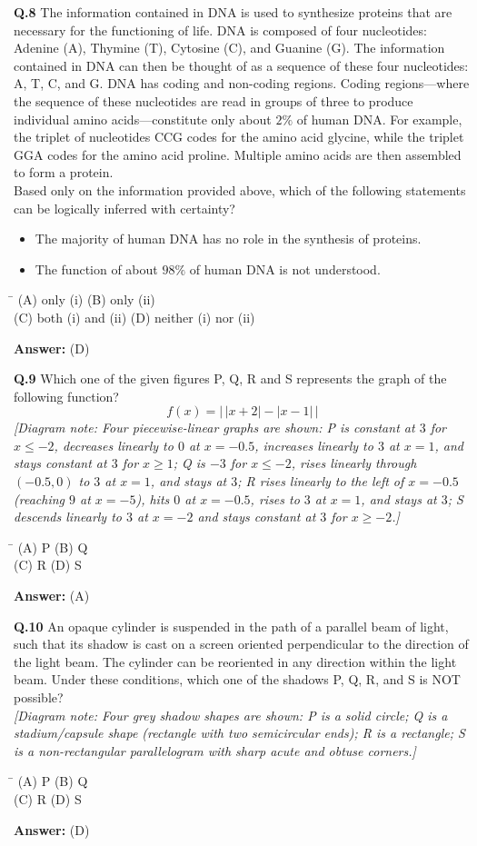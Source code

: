 \documentclass[11pt,a4paper]{article}
\newcommand{\optsfourA}[4]{%
  \begin{tabbing}
    \hspace{0.48\linewidth}\=\kill
    (A) #1 \> (B) #2 \\[2pt]
    (C) #3 \> (D) #4
  \end{tabbing}%
}
\newcommand{\ans}[1]{\textbf{Answer:} #1\par\medskip}
\begin{document}
\textbf{Q.8} The information contained in DNA is used to synthesize proteins that are necessary for the functioning of life. DNA is composed of four nucleotides: Adenine (A), Thymine (T), Cytosine (C), and Guanine (G). The information contained in DNA can then be thought of as a sequence of these four nucleotides: A, T, C, and G. DNA has coding and non-coding regions. Coding regions---where the sequence of these nucleotides are read in groups of three to produce individual amino acids---constitute only about $2\%$ of human DNA. For example, the triplet of nucleotides CCG codes for the amino acid glycine, while the triplet GGA codes for the amino acid proline. Multiple amino acids are then assembled to form a protein.\\
Based only on the information provided above, which of the following statements can be logically inferred with certainty?
\begin{itemize}
  \setlength{\itemsep}{1pt}\setlength{\parskip}{0pt}
  \item[(i)] The majority of human DNA has no role in the synthesis of proteins.
  \item[(ii)] The function of about $98\%$ of human DNA is not understood.
\end{itemize}
\optsfourA{only (i)}{only (ii)}{both (i) and (ii)}{neither (i) nor (ii)}
\ans{(D)}

\textbf{Q.9} Which one of the given figures P, Q, R and S represents the graph of the following function?
\[
  f(x) = \bigl|\,|x + 2| - |x - 1|\,\bigr|
\]
\emph{[Diagram note: Four piecewise-linear graphs are shown: P is constant at $3$ for $x \le -2$, decreases linearly to $0$ at $x = -0.5$, increases linearly to $3$ at $x = 1$, and stays constant at $3$ for $x \ge 1$; Q is $-3$ for $x \le -2$, rises linearly through $(-0.5, 0)$ to $3$ at $x = 1$, and stays at $3$; R rises linearly to the left of $x = -0.5$ (reaching $9$ at $x = -5$), hits $0$ at $x = -0.5$, rises to $3$ at $x = 1$, and stays at $3$; S descends linearly to $3$ at $x = -2$ and stays constant at $3$ for $x \ge -2$.]}
\optsfourA{P}{Q}{R}{S}
\ans{(A)}

\textbf{Q.10} An opaque cylinder is suspended in the path of a parallel beam of light, such that its shadow is cast on a screen oriented perpendicular to the direction of the light beam. The cylinder can be reoriented in any direction within the light beam. Under these conditions, which one of the shadows P, Q, R, and S is NOT possible?\\[4pt]
\emph{[Diagram note: Four grey shadow shapes are shown: P is a solid circle; Q is a stadium/capsule shape (rectangle with two semicircular ends); R is a rectangle; S is a non-rectangular parallelogram with sharp acute and obtuse corners.]}
\optsfourA{P}{Q}{R}{S}
\ans{(D)}
\end{document}
